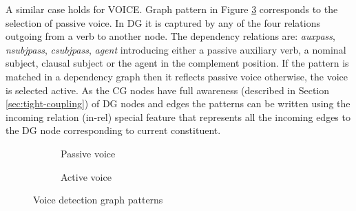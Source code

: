     A similar case holds for VOICE. Graph pattern in Figure \ref{fig:voice-pattern7} corresponds to the selection of passive voice. In DG it is captured by any of the four relations outgoing from a verb to another node. The dependency relations are: \textit{auxpass}, \textit{nsubjpass}, \textit{csubjpass}, \textit{agent} introducing either a passive auxiliary verb, a nominal subject, clausal subject or the agent in the complement position. If the pattern is matched in a dependency graph then it reflects passive voice otherwise, the voice is selected active. As the CG nodes have full awareness (described in Section \ref{sec:tight-coupling}) of DG nodes and edges the patterns can be written using the incoming relation (in-rel) special feature that represents all the incoming edges to the DG node corresponding to current constituent. 

    \begin{figure}[!ht]
        \centering
        \begin{subfigure}[t]{0.47\textwidth}
            \centering
            \caption{Passive voice}
            \label{fig:voice-pattern5}
        \end{subfigure}
        \begin{subfigure}[t]{0.47\textwidth}
            \centering
            \caption{Active voice}
            \label{fig:voice-pattern6}
        \end{subfigure}
        \caption{Voice detection graph patterns}
        \label{fig:voice-pattern7}
    \end{figure}

